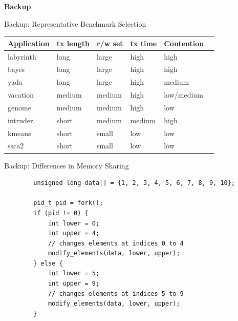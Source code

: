 \documentclass[aspectratio=169, usenames, dvipsnames]{beamer}
\begin{document}
\begin{frame}
  \centering
  \huge
  \alert{\textbf{Backup}}
\end{frame}

\begin{frame}{Backup: Representative Benchmark Selection}
    \centering
    \begin{tabular}{|l|l|l|l|l|l|}
        \hline
        \textbf{Application} & \textbf{tx length} & \textbf{r/w set} & \textbf{tx time} & \textbf{Contention}\\\hline\hline
        labyrinth & long & large & high & high\\\hline
        bayes & long & large & high & high\\\hline
        yada & long & large & high & medium\\\hline
        vacation & medium & medium & high & low/medium\\\hline
        genome & medium & medium & high & low\\\hline
        intruder & short & medium & medium & high\\\hline
        kmeans & short & small & low & low\\\hline
        ssca2 & short & small & low & low\\\hline
    \end{tabular}
\end{frame}

\begin{frame}[fragile]{Backup: Differences in Memory Sharing}
    \begin{verbatim}
        unsigned long data[] = {1, 2, 3, 4, 5, 6, 7, 8, 9, 10};

        pid_t pid = fork();
        if (pid != 0) {
            int lower = 0;
            int upper = 4;
            // changes elements at indices 0 to 4
            modify_elements(data, lower, upper);
        } else {
            int lower = 5;
            int upper = 9;
            // changes elements at indices 5 to 9
            modify_elements(data, lower, upper);
        }
    \end{verbatim}

\end{frame}
\end{document}
